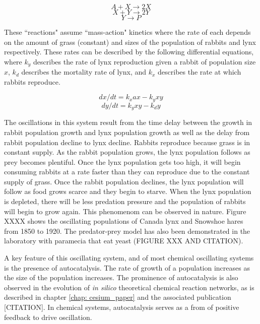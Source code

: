 \documentclass[12pt]{report}
\begin{document}
\begin{equation}
\label{eqn: LV_1}
A + X \to 2X
\end{equation}
\begin{equation}
\label{eqn: LV_2}
X + Y \to 2Y
\end{equation}
\begin{equation}
\label{eqn: LV_3}
Y \to P
\end{equation}

These ``reactions" assume ``mass-action" kinetics where the rate of each depends on the amount of grass (constant) and sizes of the population of rabbits and lynx respectively. These rates can be described by the following differential equations, where ${k_{y}}$ describes the rate of lynx reproduction given a rabbit of population size ${x}$, ${k_{d}}$ describes the mortality rate of lynx, and ${k_{x}}$ describes the rate at which rabbits reproduce. 

\begin{equation}
dx/dt = k_{x}ax - k_{y}xy
\end{equation}
\begin{equation}
dy/dt = k_{y}xy - k_{d}y
\end{equation}

The oscillations in this system result from the time delay between the growth in rabbit population growth and lynx population growth as well as the delay from rabbit population decline to lynx decline. Rabbits reproduce because grass is in constant supply. As the rabbit population grows, the lynx population follows as prey becomes plentiful. Once the lynx population gets too high, it will begin consuming rabbits at a rate faster than they can reproduce due to the constant supply of grass. Once the rabbit population declines, the lynx population will follow as food grows scarce and they begin to starve. When the lynx population is depleted, there will be less predation pressure and the population of rabbits will begin to grow again. This phenomenom can be observed in nature. Figure XXXX shows the oscillating populations of Canada lynx and Snowshoe hares from 1850 to 1920. The predator-prey model has also been demonstrated in the laboratory with paramecia that eat yeast (FIGURE XXX AND CITATION).

A key feature of this oscillating system, and of most chemical oscillating systems is the presence of autocatalysis. The rate of growth of a population increases as the size of the population increases. The prominence of autocatalysis is also observed in the evolution of \textit{in silico} theoretical chemical reaction networks, as is described in chapter \ref{chap: cesium_paper} and the associated publication [CITATION]. In chemical systems, autocatalysis serves as a from of positive feedback to drive oscillation.
\end{document}
